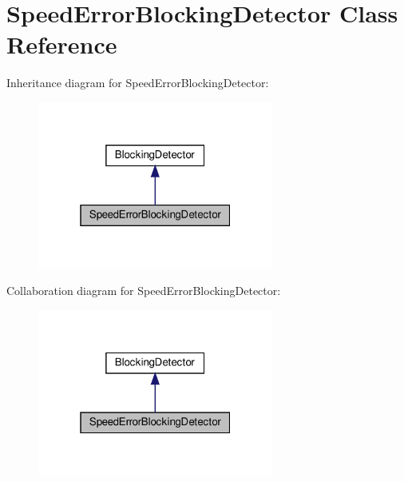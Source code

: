 \hypertarget{classSpeedErrorBlockingDetector}{}\section{Speed\+Error\+Blocking\+Detector Class Reference}
\label{classSpeedErrorBlockingDetector}


Inheritance diagram for Speed\+Error\+Blocking\+Detector\+:
\nopagebreak
\begin{figure}[H]
\begin{center}
\leavevmode
\includegraphics[width=220pt]{classSpeedErrorBlockingDetector__inherit__graph}
\end{center}
\end{figure}


Collaboration diagram for Speed\+Error\+Blocking\+Detector\+:
\nopagebreak
\begin{figure}[H]
\begin{center}
\leavevmode
\includegraphics[width=220pt]{classSpeedErrorBlockingDetector__coll__graph}
\end{center}
\end{figure}
